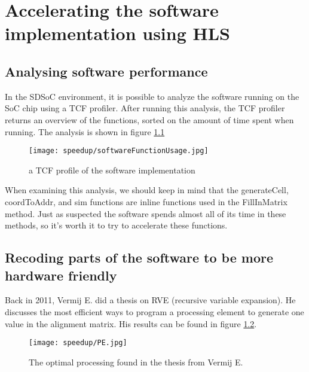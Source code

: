 
\chapter{Accelerating the software implementation using HLS}
\label{ch:HardwareImpl}

\section{Analysing software performance}

In the SDSoC environment, it is possible to analyze the software running on the SoC chip using a TCF profiler. After running this analysis, the TCF profiler returns an overview of the functions, sorted on the amount of time spent when running. The analysis is shown in figure \ref{fig:softwareFunctionUsage}

\begin{figure}[H]
	\centering
	\texttt{[image: speedup/softwareFunctionUsage.jpg]}
	\caption{a TCF profile of the software implementation}
	\label{fig:softwareFunctionUsage}
\end{figure}

When examining this analysis, we should keep in mind that the generateCell, coordToAddr, and sim functions are inline functions used in the FillInMatrix method. Just as suspected the software spends almost all of its time in these methods, so it's worth it to try to accelerate these functions.

\section{Recoding parts of the software to be more hardware friendly}

Back in 2011, Vermij E. did a thesis on RVE (recursive variable expansion). He discusses the most efficient ways to program a processing element to generate one value in the alignment matrix. His results can be found in figure \ref{fig:PE}. 

\begin{figure}[H]
	\centering
	\texttt{[image: speedup/PE.jpg]}
	\caption{The optimal processing found in the thesis from Vermij E.}
	\label{fig:PE}
\end{figure}

